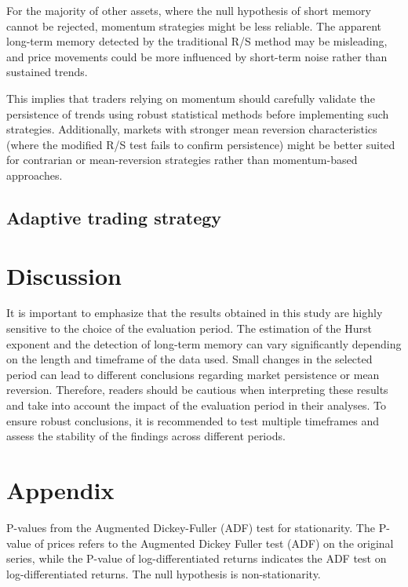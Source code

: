 \documentclass[11pt]{extarticle}
\begin{document}
For the majority of other assets, where the null hypothesis of short memory cannot be rejected, momentum strategies might be less reliable.
The apparent long-term memory detected by the traditional R/S method may be misleading, and price movements could be more influenced by short-term noise rather than sustained trends.

This implies that traders relying on momentum should carefully validate the persistence of trends using robust statistical methods before implementing
such strategies. Additionally, markets with stronger mean reversion characteristics (where the modified R/S test fails to confirm persistence) might
be better suited for contrarian or mean-reversion strategies rather than momentum-based approaches.

\subsection{Adaptive trading strategy}



\section{Discussion}

It is important to emphasize that the results obtained in this study are highly sensitive to the choice of the evaluation period.
The estimation of the Hurst exponent and the detection of long-term memory can vary significantly depending on the length and timeframe of the data used.
Small changes in the selected period can lead to different conclusions regarding market persistence or mean reversion.
Therefore, readers should be cautious when interpreting these results and take into account the impact of the evaluation period in their analyses.
To ensure robust conclusions, it is recommended to test multiple timeframes and assess the stability of the findings across different periods.

\section{Appendix}

\begin{table}[h!]
    \centering
    \caption{P-values from the Augmented Dickey-Fuller (ADF) test for stationarity. The P-value of prices refers to the Augmented Dickey Fuller test (ADF) on the original series,
     while the P-value of log-differentiated returns indicates the ADF test on log-differentiated returns. The null hypothesis is non-stationarity.}
    \label{tab:adf_results}
\end{table}
\end{document}
